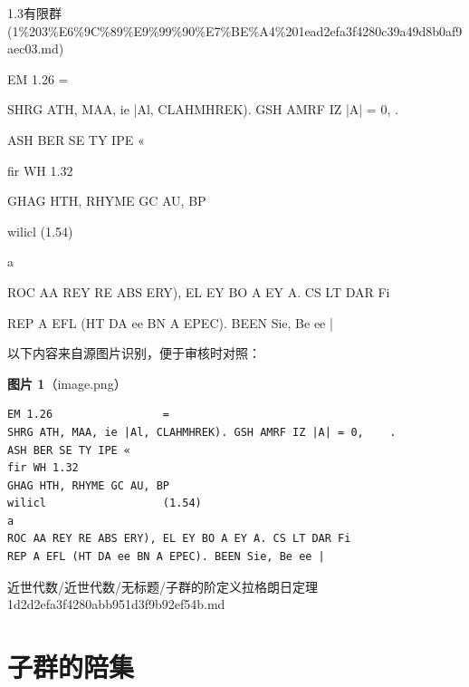 \begin{note}[来源上级主题]

1.3有限群 (1\%203\%E6\%9C\%89\%E9\%99\%90\%E7\%BE\%A4\%201ead2efa3f4280c39a49d8b0af9aec03.md)

\end{note}

\begin{theorem}[子群的阶定义拉格朗日定理]

EM 1.26                 =

SHRG ATH, MAA, ie |Al, CLAHMHREK). GSH AMRF IZ |A| = 0,    .

ASH BER SE TY IPE «

fir WH 1.32

GHAG HTH, RHYME GC AU, BP

wilicl                  (1.54)

a

ROC AA REY RE ABS ERY), EL EY BO A EY A. CS LT DAR Fi

REP A EFL (HT DA ee BN A EPEC). BEEN Sie, Be ee |

\end{theorem}

\begin{note}
以下内容来自源图片识别，便于审核时对照：

\textbf{图片 1}（image.png）
\begin{Verbatim}[fontsize=\small]
EM 1.26                 =
SHRG ATH, MAA, ie |Al, CLAHMHREK). GSH AMRF IZ |A| = 0,    .
ASH BER SE TY IPE «
fir WH 1.32
GHAG HTH, RHYME GC AU, BP
wilicl                  (1.54)
a
ROC AA REY RE ABS ERY), EL EY BO A EY A. CS LT DAR Fi
REP A EFL (HT DA ee BN A EPEC). BEEN Sie, Be ee |
\end{Verbatim}

\end{note}

\begin{note}[来源路径]

近世代数/近世代数/无标题/子群的阶定义拉格朗日定理 1d2d2efa3f4280abb951d3f9b92ef54b.md

\end{note}

\section*{子群的陪集}

